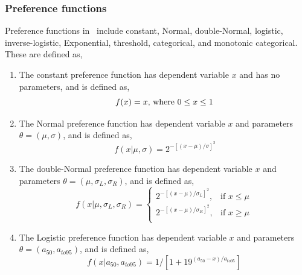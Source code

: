 \subsubsection*{Preference functions}

Preference functions in \SPM\ include constant, Normal, double-Normal, logistic, inverse-logistic, Exponential, threshold, categorical, and monotonic categorical. These are defined as,

\begin{enumerate}
\item The constant preference function has dependent variable $x$ and has no parameters, and is defined as,
\begin{equation}
f(x)=x$, where $0 \leq x \leq 1
\end{equation}

\item The Normal preference function has dependent variable $x$ and parameters $\theta = (\mu,\sigma)$, and is defined as, 
\begin{equation}\
f(x | \mu, \sigma) = 2^{-[(x- \mu)/\sigma ]^2} 
\end{equation}
 
\item The double-Normal preference function has dependent variable $x$ and parameters $\theta=(\mu,\sigma_L,\sigma_R)$, and is defined as,
\begin{equation}
  f(x | \mu, \sigma_L, \sigma_R) = \begin{cases}
    2^{-[(x- \mu)/\sigma_L ]^2}, & \text{if $x \leq \mu$} \\
    2^{-[(x- \mu)/\sigma_R ]^2}, & \text{if $x \ge \mu$}\\
  \end{cases}
\end{equation} 

\item The Logistic preference function  has dependent variable $x$ and parameters $\theta = (a_{50},a_{to95})$, and is defined as,
\begin{equation}
  f(x | a_{50}, a_{to95}) = 1 / [1+19^{(a_{50}-x)/a_{to95}}]
\end{equation}


\end{enumerate}
